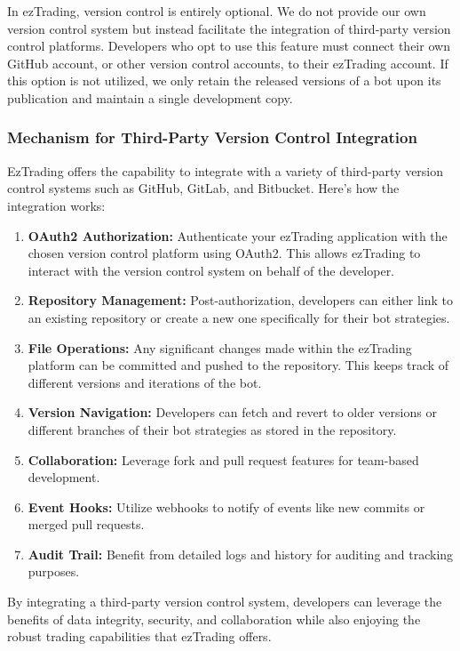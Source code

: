 In ezTrading, version control is entirely optional. We do not provide our own version control system but instead facilitate the integration of third-party version control platforms. Developers who opt to use this feature must connect their own GitHub account, or other version control accounts, to their ezTrading account. If this option is not utilized, we only retain the released versions of a bot upon its publication and maintain a single development copy.

\subsubsection{Mechanism for Third-Party Version Control Integration}
\label{subsubsec:third-party-version-control}

EzTrading offers the capability to integrate with a variety of third-party version control systems such as GitHub, GitLab, and Bitbucket. Here's how the integration works:

\begin{enumerate}
    \item \textbf{OAuth2 Authorization:} Authenticate your ezTrading application with the chosen version control platform using OAuth2. This allows ezTrading to interact with the version control system on behalf of the developer.
    \item \textbf{Repository Management:} Post-authorization, developers can either link to an existing repository or create a new one specifically for their bot strategies.
    \item \textbf{File Operations:} Any significant changes made within the ezTrading platform can be committed and pushed to the repository. This keeps track of different versions and iterations of the bot.
    \item \textbf{Version Navigation:} Developers can fetch and revert to older versions or different branches of their bot strategies as stored in the repository.
    \item \textbf{Collaboration:} Leverage fork and pull request features for team-based development.
    \item \textbf{Event Hooks:} Utilize webhooks to notify of events like new commits or merged pull requests.
    \item \textbf{Audit Trail:} Benefit from detailed logs and history for auditing and tracking purposes.
\end{enumerate}

By integrating a third-party version control system, developers can leverage the benefits of data integrity, security, and collaboration while also enjoying the robust trading capabilities that ezTrading offers.


